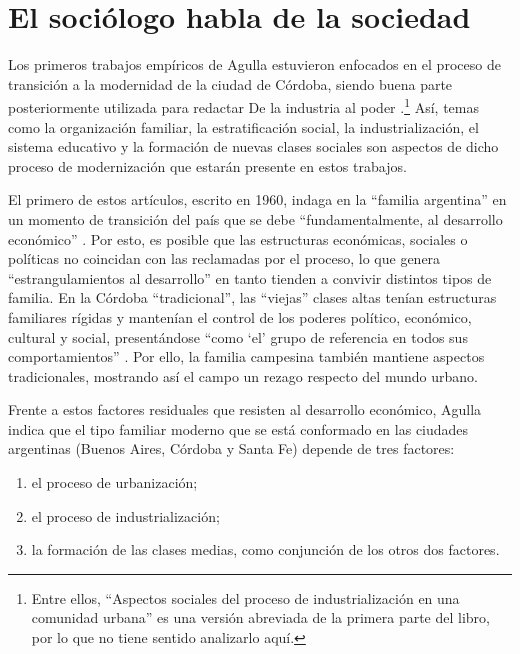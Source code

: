 \section{El sociólogo habla de la sociedad}

Los primeros trabajos empíricos de Agulla estuvieron enfocados en el proceso de transición a la modernidad de la ciudad de Córdoba, siendo buena parte posteriormente utilizada para redactar De la industria al poder \parencite{1633-AGULLA1966}.\footnote{Entre ellos, \enquote{Aspectos sociales del proceso de industrialización en una comunidad urbana} \parencite{1646-AGULLA1963} es una versión abreviada de la primera parte del libro, por lo que no tiene sentido analizarlo aquí.} Así, temas como la organización familiar, la estratificación social, la industrialización, el sistema educativo y la formación de nuevas clases sociales son aspectos de dicho proceso de modernización que estarán presente en estos trabajos.

El primero de estos artículos, escrito en 1960, indaga en la \enquote{familia argentina} en un momento de transición del país que se debe \enquote{fundamentalmente, al desarrollo económico} \parencite[129]{1641-AGULLA1965}. Por esto, es posible que las estructuras económicas, sociales o políticas no coincidan con las reclamadas por el proceso, lo que genera \enquote{estrangulamientos al desarrollo} en tanto tienden a convivir distintos tipos de familia. En la Córdoba \enquote{tradicional}, las \enquote{viejas} clases altas tenían estructuras familiares rígidas y mantenían el control de los poderes político, económico, cultural y social, presentándose \enquote{como \enquote{el} grupo de referencia en todos sus comportamientos} \parencite[137]{1641-AGULLA1965}. Por ello, la familia campesina también mantiene aspectos tradicionales, mostrando así el campo un rezago respecto del mundo urbano.

Frente a estos factores residuales que resisten al desarrollo económico, Agulla indica que el tipo familiar moderno que se está conformado en las ciudades argentinas (Buenos Aires, Córdoba y Santa Fe) depende de tres factores:

\begin{enumerate}
\item el proceso de urbanización;
\item el proceso de industrialización;
\item la formación de las clases medias, como conjunción de los otros dos factores.
\end{enumerate}

